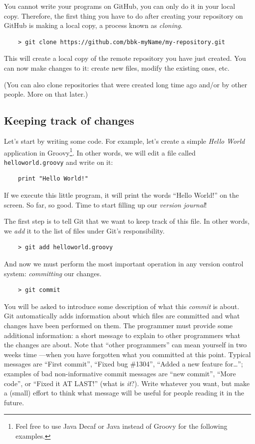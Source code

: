 You cannot write your programs on GitHub, you can only do it in your
local copy. Therefore, the first thing you have to do after creating
your repository on GitHub is making a local copy, a process known as
\emph{cloning}. 

\begin{verbatim}
    > git clone https://github.com/bbk-myName/my-repository.git
\end{verbatim}

This will create a local copy of the remote repository you have just
created. You can now make changes to it: create new files, modify the
existing ones, etc.

(You can also clone repositories that were created long time ago and/or
by other people. More on that later.) 

\subsection{Keeping track of changes}
\label{sec:keep-track-chang}

Let's start by writing some code. For example, let's create a
simple \emph{Hello World} application in Groovy\footnote{Feel free to
  use Java Decaf or Java instead of Groovy for the following
  examples.}. In other words, we 
will edit a file called \verb+helloworld.groovy+ and write on it:

\begin{verbatim}
    print "Hello World!"
\end{verbatim}

If we execute this little program, it will print the words ``Hello
World!'' on the screen. So far, so good. Time to start filling up our
\emph{version journal}! 

The first step is to tell Git that we want to keep track of this
file. In other words, we \emph{add} it to the list of files under
Git's responsibility. 

\begin{verbatim}
    > git add helloworld.groovy
\end{verbatim}

And now we must perform the most important operation in any version control
system: \emph{committing} our changes. 

\begin{verbatim}
    > git commit
\end{verbatim}

You will be asked to introduce some description of what this \emph{commit}
is about. Git automatically adds information about which files are
committed and what changes have been performed on them. The programmer
must provide some additional information: a short message to explain
to other programmers what the changes are about. Note that ``other
programmers'' can mean yourself in two weeks time ---when you have
forgotten what you committed at this point. Typical messages are
``First commit'', ``Fixed bug \#1304'', ``Added a new feature
for\ldots''; examples of bad non-informative commit messages are ``new
commit'', ``More code'', or ``Fixed it AT LAST!'' (what is
\emph{it}?). Write whatever you 
want, but make a (small) effort to think what message will be useful
for people reading it in the future.

